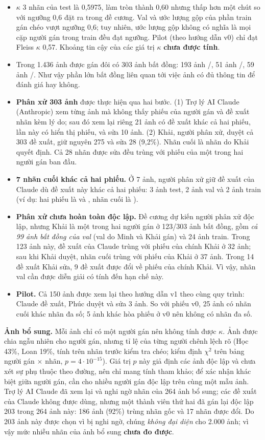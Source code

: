 \begin{itemize}
  \item $\kappa$ 3 nhãn của test là 0,5975, làm tròn thành 0,60 nhưng thấp hơn một chút so với ngưỡng 0,6 đặt ra trong đề cương. Val và ước lượng gộp của phần train gán chéo vượt ngưỡng 0,6; tuy nhiên, ước lượng gộp không có nghĩa là mọi cặp người gán trong train đều đạt ngưỡng. Pilot (theo hướng dẫn v0) chỉ đạt Fleiss $\kappa$ 0,57. Khoảng tin cậy của các giá trị $\kappa$ \textbf{chưa được tính}.
  \item Trong 1.436 ảnh được gán đôi có 303 ảnh bất đồng: 193 ảnh /, 51 ảnh /, 59 ảnh /. Như vậy phần lớn bất đồng liên quan tới việc ảnh có đủ thông tin để đánh giá hay không.
  \item \textbf{Phân xử 303 ảnh} được thực hiện qua hai bước. (1) Trợ lý AI Claude (Anthropic) xem từng ảnh mà không thấy phiếu của người gán và đề xuất nhãn kèm lý do; sau đó xem lại riêng 21 ảnh có đề xuất khác cả hai phiếu, lần này có hiển thị phiếu, và sửa 10 ảnh. (2) Khải, người phân xử, duyệt cả 303 đề xuất, giữ nguyên 275 và sửa 28 (9,2\%). Nhãn cuối là nhãn do Khải quyết định. Cả 28 nhãn được sửa đều trùng với phiếu của một trong hai người gán ban đầu.
  \item \textbf{7 nhãn cuối khác cả hai phiếu.} Ở 7 ảnh, người phân xử giữ đề xuất của Claude dù đề xuất này khác cả hai phiếu: 3 ảnh test, 2 ảnh val và 2 ảnh train (ví dụ: hai phiếu là  và , nhãn cuối là ).
  \item \textbf{Phân xử chưa hoàn toàn độc lập.} Đề cương dự kiến người phân xử độc lập, nhưng Khải là một trong hai người gán ở 123/303 ảnh bất đồng, gồm \emph{cả 99 ảnh bất đồng của val} (val do Minh và Khải gán) và 24 ảnh train. Trong 123 ảnh này, đề xuất của Claude trùng với phiếu của chính Khải ở 32 ảnh; sau khi Khải duyệt, nhãn cuối trùng với phiếu của Khải ở 37 ảnh. Trong 14 đề xuất Khải sửa, 9 đề xuất được đổi về phiếu của chính Khải. Vì vậy, nhãn val cần được diễn giải có tính đến hạn chế này.
  \item \textbf{Pilot.} Cả 150 ảnh được xem lại theo hướng dẫn v1 theo cùng quy trình: Claude đề xuất, Phúc duyệt và sửa 3 ảnh. So với phiếu v0, 25 ảnh có nhãn cuối khác nhãn đa số; 5 ảnh khác hòa phiếu ở v0 nên không có nhãn đa số.
\end{itemize}

\textbf{Ảnh bổ sung.} Mỗi ảnh chỉ có một người gán nên không tính được $\kappa$. Ảnh được chia ngẫu nhiên cho người gán, nhưng tỉ lệ  của từng người chênh lệch rõ (Học 43\%, Loan 19\%, tính trên nhãn trước kiểm tra chéo; kiểm định $\chi^2$ trên bảng người gán $\times$ nhãn, $p = 4\cdot10^{-15}$). Giá trị $p$ này giả định các ảnh độc lập và chưa xét sự phụ thuộc theo đường, nên chỉ mang tính tham khảo; để xác nhận khác biệt giữa người gán, cần cho nhiều người gán độc lập trên cùng một mẫu ảnh. Trợ lý AI Claude đã xem lại và nghi ngờ nhãn của 264 ảnh bổ sung; các đề xuất của Claude không được dùng, nhưng một thành viên thứ hai đã gán lại độc lập 203 trong 264 ảnh này: 186 ảnh (92\%) trùng nhãn gốc và 17 nhãn được đổi. Do 203 ảnh này được chọn vì bị nghi ngờ, chúng \emph{không đại diện} cho 2.000 ảnh; vì vậy mức nhiễu nhãn của ảnh bổ sung \textbf{chưa đo được}.

